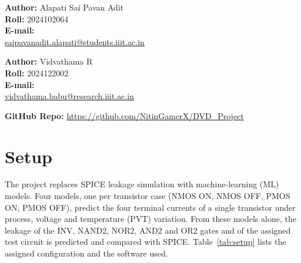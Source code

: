 \documentclass[12pt, a4paper]{article}
\begin{document}
\begin{titlepage}
    \vspace{0.8cm}

    \begin{minipage}[t]{0.45\linewidth}
        \raggedright
        \textbf{Author:} Alapati Sai Pavan Adit \\
        \textbf{Roll:} 2024102064 \\
        \textbf{E-mail:} \\
        {\scriptsize \href{mailto:saipavanadit.alapati@students.iiit.ac.in}{saipavanadit.alapati@students.iiit.ac.in}}
    \end{minipage}%
    \hfill
    \begin{minipage}[t]{0.45\linewidth}
        \raggedright
        \textbf{Author:} Vidvathama R \\
        \textbf{Roll:} 2024122002 \\
        \textbf{E-mail:} \\
        {\scriptsize \href{mailto:vidvathama.babu@research.iiit.ac.in}{vidvathama.babu@research.iiit.ac.in}}
    \end{minipage}

    \vspace{0.9cm}

    \textbf{GitHub Repo:} \href{https://github.com/NitinGamerX/DVD_Project}{https://github.com/NitinGamerX/DVD\_Project}

    \vfill

\end{titlepage}

\thispagestyle{tocpage}
\tableofcontents
\newpage

\section{Setup}
\label{sec:setup}

\noindent The project replaces SPICE leakage simulation with machine-learning (ML) models. Four models, one per transistor case (NMOS ON, NMOS OFF, PMOS ON, PMOS OFF), predict the four terminal currents of a single transistor under process, voltage and temperature (PVT) variation. From these models alone, the leakage of the INV, NAND2, NOR2, AND2 and OR2 gates and of the assigned test circuit is predicted and compared with SPICE. Table~\ref{tab:setup} lists the assigned configuration and the software used.
\end{document}
